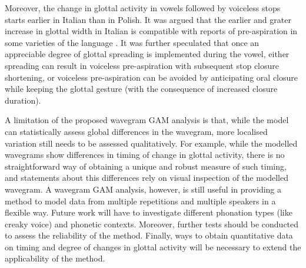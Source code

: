 \documentclass[
  11pt,
  a4paper,
]{article}
\begin{document}
Moreover, the change in glottal activity in vowels followed by voiceless
stops starts earlier in Italian than in Polish. It was argued that the
earlier and grater increase in glottal width in Italian is compatible
with reports of pre-aspiration in some varieties of the language
\citep{ni-chasaide1993, stevens2014a}. It was further speculated that
once an appreciable degree of glottal spreading is implemented during
the vowel, either spreading can result in voiceless pre-aspiration with
subsequent stop closure shortening, or voiceless pre-aspiration can be
avoided by anticipating oral closure while keeping the glottal gesture
(with the consequence of increased closure duration).

A limitation of the proposed wavegram GAM analysis is that, while the
model can statistically assess global differences in the wavegram, more
localised variation still needs to be assessed qualitatively. For
example, while the modelled wavegrams show differences in timing of
change in glottal activity, there is no straightforward way of obtaining
a unique and robust measure of such timing, and statements about this
differences rely on visual inspection of the modelled wavegram. A
wavegram GAM analysis, however, is still useful in providing a method to
model data from multiple repetitions and multiple speakers in a flexible
way. Future work will have to investigate different phonation types
(like creaky voice) and phonetic contexts. Moreover, further tests
should be conducted to assess the reliability of the method. Finally,
ways to obtain quantitative data on timing and degree of changes in
glottal activity will be necessary to extend the applicability of the
method.

  
\end{document}
